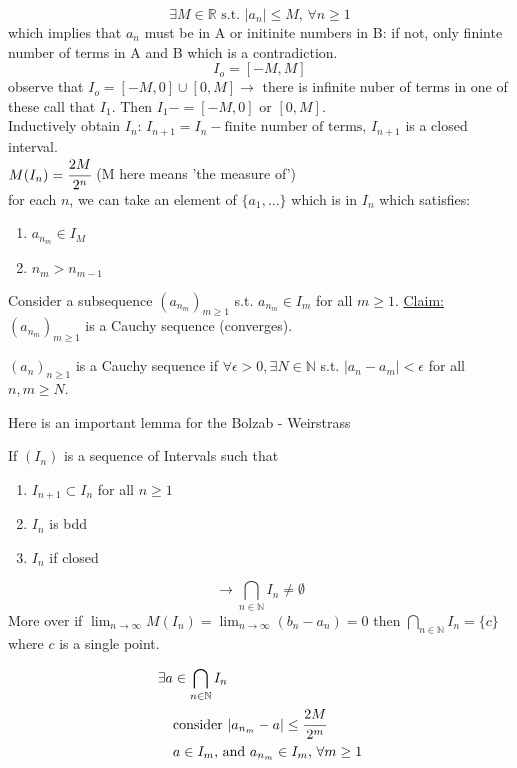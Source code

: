 \documentclass{article}
\begin{document}
$$\exists M \in \mathbb{R} \text{ s.t. } |a_n| \leq M \text{,     }\forall n \geq 1$$
which implies that $a_n$ must be in A or initinite numbers in B: if not, only fininte number of terms in A and B which is a contradiction. $$I_o = [-M, M]$$ observe that $I_o =[-M, 0] \cup [0, M] \rightarrow$ there is infinite nuber of terms in one of these call that $I_1$. Then $I_1 - =[-M, 0] \text{ or } [0, M]$. \\ 
Inductively obtain $I_n$:  $I_{n+1} = I_n - \text{finite number of terms}$, $I_{n+1}$ is a closed interval. 
\\ 
$M(I_n) = \cfrac{2M}{2^n}$ (M here means 'the measure of')\\ 
for each $n$, we can take an element of $\{a_1, \dots\}$ which is in $I_n$ which satisfies: 
\begin{enumerate}
    \item $a_{n_m} \in I_M$
    \item $n_m > n_{m-1}$
\end{enumerate}
Consider a subsequence $(a_{n_m})_{m \geq 1}$ s.t. $a_{n_m} \in I_m$ for all $m \geq 1$.
\underline{Claim:} $(a_{n_m})_{m \geq 1}$ is a Cauchy sequence (converges).
\begin{definition} 
    
    $(a_n)_{n \geq 1}$ is a Cauchy sequence if $\forall \epsilon > 0, \exists N \in \mathbb{N}$ s.t. $|a_n - a_m| < \epsilon$ for all $n, m \geq N$.
    
\end{definition}

Here is an important lemma for the Bolzab - Weirstrass 
\begin{lemma}
    If $(I_n)$ is a sequence of Intervals such that 
    \begin{enumerate}
        \item $I_{n+1} \subset I_n$ for all $n \geq 1$
        \item $I_n$ is bdd 
        \item $I_n$ if closed 
    \end{enumerate}
    $$\rightarrow \bigcap_{n\in \mathbb{N}} I_n \neq \emptyset$$
    More over if $\lim_{n \to \infty} M(I_n) = \lim_{n \to \infty} (b_n - a_n) = 0$ then $\bigcap_{n \in \mathbb{N}} I_n = \{c\}$ where $c$ is a single point.

\end{lemma}
\begin{align*}
    \exists a &\in \bigcap_{n \in \mathbb{N}} I_n \\ 
    &\text{consider  } |a_{n_m} - a| \leq \cfrac{2M}{2^m} \\
    &a\in I_m \text{,  and   } a_{n_m} \in I_m \text{,     } \forall m \geq 1 \\
\end{align*}
\end{document}
